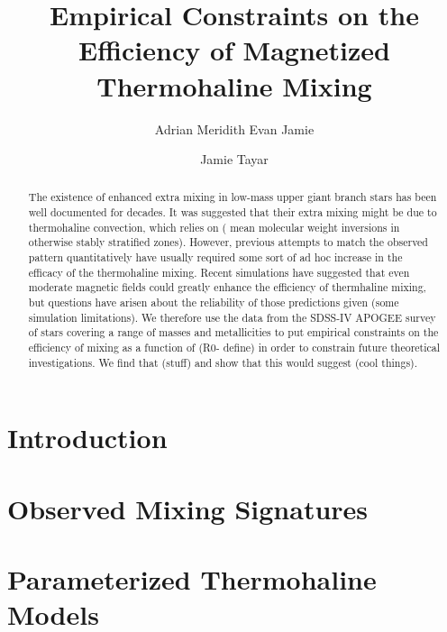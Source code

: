 \documentclass[linenumbers,twocolumn]{aastex62}
\begin{document}
\title{Empirical Constraints on the Efficiency of Magnetized Thermohaline Mixing}

\author{Adrian Meridith Evan Jamie}


\author[0000-0002-4818-7885]{Jamie Tayar}


\begin{abstract}
The existence of enhanced extra mixing in low-mass upper giant branch stars has been well documented for decades. It was suggested that their extra mixing might be due to thermohaline convection, which relies on ( mean molecular weight inversions in otherwise stably stratified zones). However, previous attempts to match the observed pattern quantitatively have usually required some sort of ad hoc increase in the efficacy of the thermohaline mixing. Recent simulations have suggested that even moderate magnetic fields could greatly enhance the efficiency of thermhaline mixing, but questions have arisen about the reliability of those predictions given (some simulation limitations). We therefore use the data from the SDSS-IV APOGEE survey of stars covering a range of masses and metallicities to put empirical constraints on the efficiency of mixing as a function of (R0- define) in order to constrain future theoretical investigations. We find that (stuff) and show that this would suggest (cool things).  
\end{abstract}


\section{Introduction}
\label{sec:intro}
\setcounter{footnote}{0}


\section{Observed Mixing Signatures} 
\label{sec:obs}



\section{Parameterized Thermohaline Models}
\label{sec:parameterizations}

\end{document}
